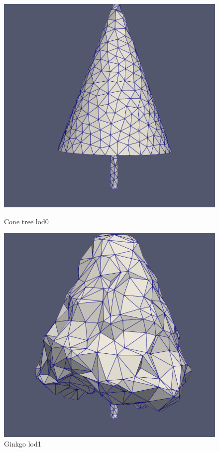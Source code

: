 \documentclass[12pt]{article}
\begin{document}
\begin{figure}[H]
    \centering
    \begin{minipage}{0.45\textwidth}
        \centering
        \includegraphics[width=1\textwidth]{images/tree-cone_lod0.png}
        \caption{Cone tree lod0}
    \end{minipage}\hfill
    \begin{minipage}{0.45\textwidth}
        \centering
        \includegraphics[width=1\textwidth]{images/tree-cone_lod1.png}
        \caption{Ginkgo lod1}
    \end{minipage}
\end{figure}
\end{document}
